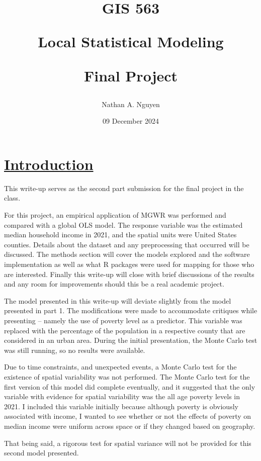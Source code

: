 \documentclass[
]{article}
\title{\vspace{5cm}

GIS 563

Local Statistical Modeling

Final Project}
\author{Nathan A. Nguyen}
\date{09 December 2024}
\begin{document}
\maketitle

\newpage

\section{\texorpdfstring{\ul{Introduction}}{Introduction}}\label{introduction}

This write-up serves as the second part submission for the final project
in the class.

For this project, an empirical application of MGWR was performed and
compared with a global OLS model. The response variable was the
estimated median household income in 2021, and the spatial units were
United States counties. Details about the dataset and any preprocessing
that occurred will be discussed. The methods section will cover the
models explored and the software implementation as well as what R
packages were used for mapping for those who are interested. Finally
this write-up will close with brief discussions of the results and any
room for improvements should this be a real academic project.

The model presented in this write-up will deviate slightly from the
model presented in part 1. The modifications were made to accommodate
critiques while presenting -- namely the use of poverty level as a
predictor. This variable was replaced with the percentage of the
population in a respective county that are considered in an urban area.
During the initial presentation, the Monte Carlo test was still running,
so no results were available.

Due to time constraints, and unexpected events, a Monte Carlo test for
the existence of spatial variability was not performed. The Monte Carlo
test for the first version of this model did complete eventually, and it
suggested that the only variable with evidence for spatial variability
was the all age poverty levels in 2021. I included this variable
initially because although poverty is obviously associated with income,
I wanted to see whether or not the effects of poverty on median income
were uniform across space or if they changed based on geography.

That being said, a rigorous test for spatial variance will not be
provided for this second model presented.

\newpage
\end{document}
